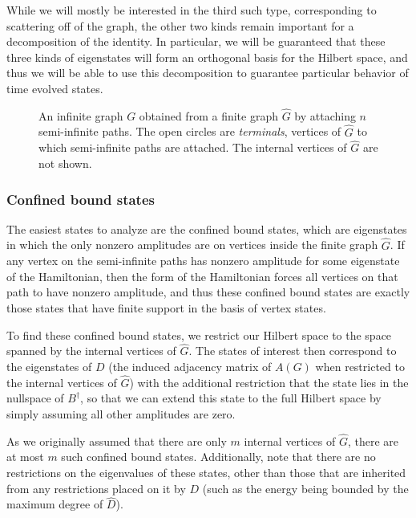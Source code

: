 \documentclass[../thesis-main/thesis-main]{subfiles}
\begin{document}
While we will mostly be interested in the third such type, corresponding to scattering off of the graph, the other two kinds remain important for a decomposition of the identity.  In particular, we will be guaranteed that these three kinds of eigenstates will form an orthogonal basis for the Hilbert space, and thus we will be able to use this decomposition to guarantee particular behavior of time evolved states.

\begin{figure}
  \centering
  
  \caption[Infinite used for scattering]{An infinite graph $G$ obtained from a finite graph $\widehat{G}$ by attaching $n$ semi-infinite paths. The open circles are \emph{terminals}, vertices of $\widehat{G}$ to which semi-infinite paths are attached. The internal vertices of $\widehat{G}$ are not shown.}
  \label{fig:basic_graph}
\end{figure}


\subsubsection{Confined bound states}

The easiest states to analyze are the confined bound states, which are eigenstates in which the only nonzero amplitudes are on vertices inside the finite graph $\widehat{G}$. If any vertex on the semi-infinite paths has nonzero amplitude for some eigenstate of the Hamiltonian, then the form of the Hamiltonian forces all vertices on that path to have nonzero amplitude, and thus these confined bound states are exactly those states that have finite support in the basis of vertex states.  

To find these confined bound states, we restrict our Hilbert space to the space spanned by the internal vertices of $\widehat{G}$. The states of interest then correspond to the eigenstates of $D$ (the induced adjacency matrix of $A(G)$ when restricted to the internal vertices of $\widehat{G}$) with the additional restriction that the state lies in the nullspace of $B^\dag$, so that we can extend this state to the full Hilbert space by simply assuming all other amplitudes are zero.    

As we originally assumed that there are only $m$ internal vertices of $\widehat{G}$, there are at most $m$ such confined bound states.  Additionally, note that there are no restrictions on the eigenvalues of these states, other than those that are inherited from any restrictions placed on it by $D$ (such as the energy being bounded by the maximum degree of $\widehat{D}$).
\end{document}
